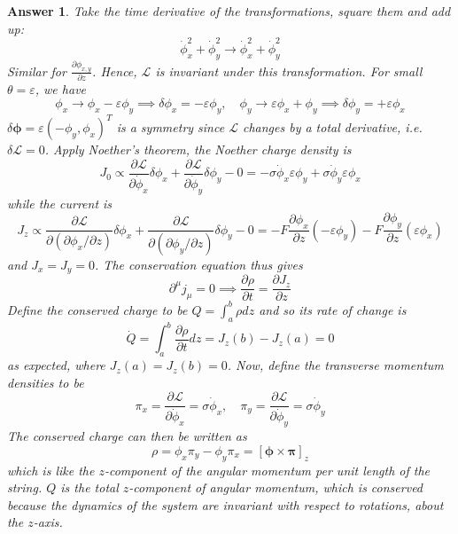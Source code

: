 \documentclass[a4paper]{article}
\newtheorem{ans}{Answer}[section]
\theoremstyle{new}
\begin{document}
\begin{ans}
Take the time derivative of the transformations, square them and add up:
$$\dot{\phi}_x^2+\dot{\phi}_y^2\rightarrow\dot{\phi}_x^2+\dot{\phi}_y^2$$
Similar for $\frac{\partial\phi_{x,y}}{\partial z}$. Hence, $\mathcal{L}$ is invariant under this transformation. For small $\theta=\varepsilon$, we have
$$\phi_x\rightarrow\phi_x-\varepsilon\phi_y\implies\delta\phi_x=-\varepsilon\phi_y,\quad\phi_y\rightarrow\varepsilon\phi_x+\phi_y\implies\delta\phi_y=+\varepsilon\phi_x$$
$\delta\boldsymbol{\phi}=\varepsilon(-\phi_y,\phi_x)^T$ is a symmetry since $\mathcal{L}$ changes by a total derivative, i.e. $\delta\mathcal{L}=0$. Apply Noether's theorem, the Noether charge density is
$$J_0\propto\frac{\partial\mathcal{L}}{\partial\dot{\phi}_x}\delta\phi_x+\frac{\partial\mathcal{L}}{\partial\dot{\phi}_y}\delta\phi_y-0=-\sigma\dot{\phi}_x\varepsilon\phi_y+\sigma\dot{\phi}_y\varepsilon\phi_x$$
while the current is
$$J_z\propto\frac{\partial\mathcal{L}}{\partial(\partial\phi_x/\partial z)}\delta\phi_x+\frac{\partial\mathcal{L}}{\partial(\partial\phi_y/\partial z)}\delta\phi_y-0=-F\frac{\partial\phi_x}{\partial z}(-\varepsilon\phi_y)-F\frac{\partial\phi_y}{\partial z}(\varepsilon\phi_x)$$
and $J_x=J_y=0$. The conservation equation thus gives
$$\partial^\mu j_\mu=0\implies\frac{\partial\rho}{\partial t}=\frac{\partial J_z}{\partial z}$$
Define the conserved charge to be $Q=\int_a^b\rho dz$ and so its rate of change is
$$\dot{Q}=\int_a^b\frac{\partial\rho}{\partial t}dz=J_z(b)-J_z(a)=0$$
as expected, where $J_z(a)=J_z(b)=0$. Now, define the transverse momentum densities to be
$$\pi_x=\frac{\partial\mathcal{L}}{\partial\dot{\phi}_x}=\sigma\dot{\phi}_x,\quad\pi_y=\frac{\partial\mathcal{L}}{\partial\dot{\phi}_y}=\sigma\dot{\phi}_y$$
The conserved charge can then be written as
$$\rho=\phi_x\pi_y-\phi_y\pi_x=[\boldsymbol{\phi}\times\boldsymbol{\pi}]_z$$
which is like the $z$-component of the angular momentum per unit length of the string. $Q$ is the total $z$-component of angular momentum, which is conserved because the dynamics of the system are invariant with respect to rotations, about the $z$-axis.
\end{ans}
\end{document}
